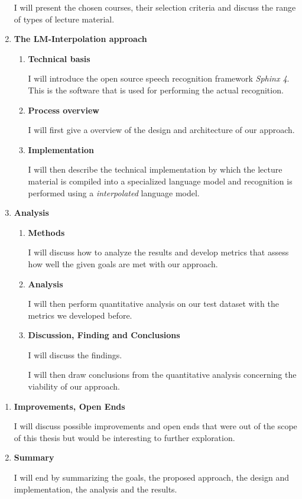 \begin{enumerate}
  I will present the chosen courses, their selection criteria and
  discuss the range of types of lecture material.
\item
  \textbf{The LM-Interpolation approach}

  \begin{enumerate}
  \item
    \textbf{Technical basis}

    I will introduce the open source speech recognition framework
    \emph{Sphinx 4}. This is the software that is used for performing
    the actual recognition.
  \item
    \textbf{Process overview}

    I will first give a overview of the design and architecture of our
    approach.
  \item
    \textbf{Implementation}

    I will then describe the technical implementation by which the
    lecture material is compiled into a specialized language model and
    recognition is performed using a \emph{interpolated} language model.
  \end{enumerate}
\item
  \textbf{Analysis}

  \begin{enumerate}
  \item
    \textbf{Methods}

    I will discuss how to analyze the results and develop metrics that
    assess how well the given goals are met with our approach. 
  \item
    \textbf{Analysis}

    I will then perform quantitative analysis on our test dataset with
    the metrics we developed before.
  \item
    \textbf{Discussion, Finding and Conclusions}

    I will discuss the findings.

    I will then draw conclusions from the quantitative analysis
    concerning the viability of our approach.
  \end{enumerate}
\end{enumerate}

\begin{enumerate}
\def\labelenumi{(\arabic{enumi})}
\item
  \textbf{Improvements, Open Ends}

  I will discuss possible improvements and open ends that were out of
  the scope of this thesis but would be interesting to further
  exploration.
\item
  \textbf{Summary}

  I will end by summarizing the goals, the proposed approach, the design
  and implementation, the analysis and the results.
\end{enumerate}

